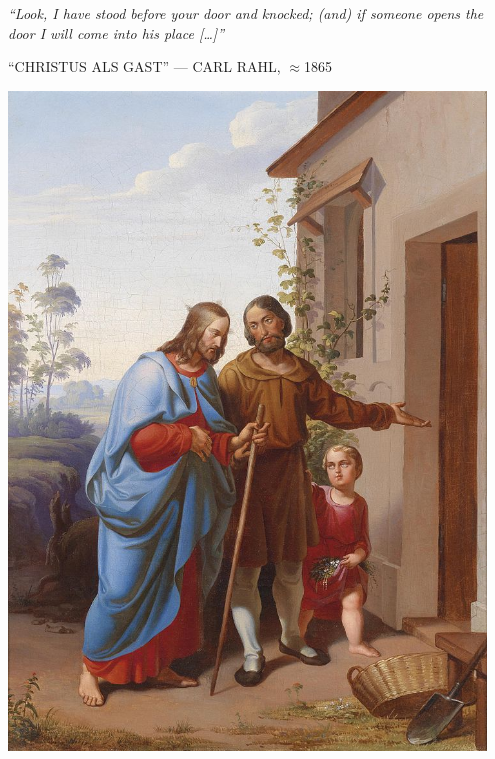 \clearpage
\thispagestyle{empty}
\null\vfill
\settowidth{}
\begin{center}
\parbox{\longest}{%
  \raggedright{\huge\itshape%
    ``Look, I have stood before your door and knocked; (and) if someone opens the door I will come into his place […]'' \par\bigskip
  }
  \raggedleft\Large\MakeUppercase{``Christus als Gast'' — Carl Rahl, $\approx$1865}\par%
}
\vfill\vfill
\clearpage\newpage
\end{center}
\newpage
\thispagestyle{empty}
\begin{center}
	\includegraphics[width=0.95\textwidth]{images/illustrations/carlrahlchristushaus.jpg}
\end{center}